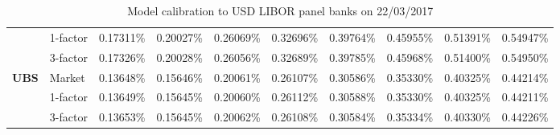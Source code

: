 \documentclass[12pt,a4paper]{article}
\theoremstyle{plain}
\numberwithin{equation}{section}
\begin{document}
\begin{table}[t]
{\begin{tabular}{|rl|cccccccc|}
\cmidrule{3-10}          & 1-factor & 0.17311\% & 0.20027\% & 0.26069\% & 0.32696\% & 0.39764\% & 0.45955\% & 0.51391\% & 0.54947\% \\
          & 3-factor & 0.17326\% & 0.20028\% & 0.26056\% & 0.32689\% & 0.39785\% & 0.45968\% & 0.51400\% & 0.54950\% \\
    \midrule
    \midrule
    \multicolumn{1}{|l}{\textbf{UBS}} & Market & 0.13648\% & 0.15646\% & 0.20061\% & 0.26107\% & 0.30586\% & 0.35330\% & 0.40325\% & 0.44214\% \\
\cmidrule{3-10}          & 1-factor & 0.13649\% & 0.15645\% & 0.20060\% & 0.26112\% & 0.30588\% & 0.35330\% & 0.40325\% & 0.44211\% \\
          & 3-factor & 0.13653\% & 0.15645\% & 0.20062\% & 0.26108\% & 0.30584\% & 0.35334\% & 0.40330\% & 0.44226\% \\

    \bottomrule
    \end{tabular}%
    }
     \caption{Model calibration to USD LIBOR panel banks on 22/03/2017 }
  \label{CDSfit170322}%
\end{table}%
\end{document}
